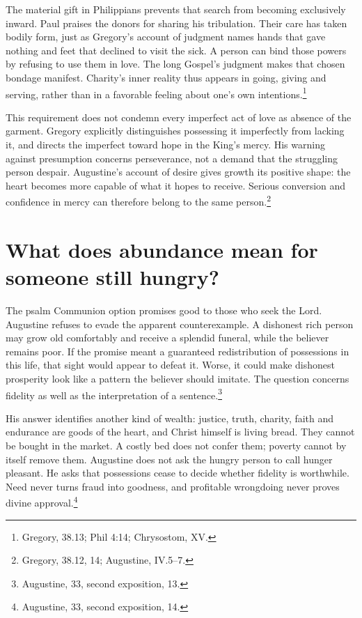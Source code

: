 The material gift in Philippians prevents that search from becoming exclusively inward. Paul praises the donors for sharing his tribulation. Their care has taken bodily form, just as Gregory's account of judgment names hands that gave nothing and feet that declined to visit the sick. A person can bind those powers by refusing to use them in love. The long Gospel's judgment makes that chosen bondage manifest. Charity's inner reality thus appears in going, giving and serving, rather than in a favorable feeling about one's own intentions.\footnote{Gregory,  38.13; Phil 4:14; Chrysostom,  XV.}

This requirement does not condemn every imperfect act of love as absence of the garment. Gregory explicitly distinguishes possessing it imperfectly from lacking it, and directs the imperfect toward hope in the King's mercy. His warning against presumption concerns perseverance, not a demand that the struggling person despair. Augustine's account of desire gives growth its positive shape: the heart becomes more capable of what it hopes to receive. Serious conversion and confidence in mercy can therefore belong to the same person.\footnote{Gregory,  38.12, 14; Augustine,  IV.5--7.}

\section{What does abundance mean for someone still hungry?}
The psalm Communion option promises good to those who seek the Lord. Augustine refuses to evade the apparent counterexample. A dishonest rich person may grow old comfortably and receive a splendid funeral, while the believer remains poor. If the promise meant a guaranteed redistribution of possessions in this life, that sight would appear to defeat it. Worse, it could make dishonest prosperity look like a pattern the believer should imitate. The question concerns fidelity as well as the interpretation of a sentence.\footnote{Augustine,  33, second exposition, 13.}

His answer identifies another kind of wealth: justice, truth, charity, faith and endurance are goods of the heart, and Christ himself is living bread. They cannot be bought in the market. A costly bed does not confer them; poverty cannot by itself remove them. Augustine does not ask the hungry person to call hunger pleasant. He asks that possessions cease to decide whether fidelity is worthwhile. Need never turns fraud into goodness, and profitable wrongdoing never proves divine approval.\footnote{Augustine,  33, second exposition, 14.}

